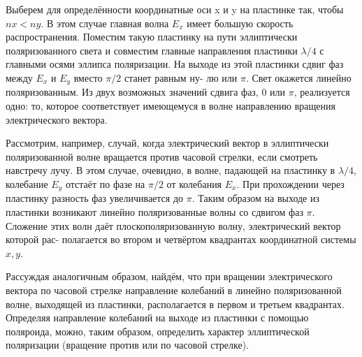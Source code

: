 \documentclass[a4paper,12pt]{article}
\begin{document}
Выберем для определённости координатные оси x и y на пластинке
так, чтобы $ nx < ny $. В этом случае главная волна $ E_x $ имеет большую
скорость распространения. Поместим такую пластинку на пути эллиптически поляризованного света и совместим главные направления пластинки $ \lambda/4 $ с главными осями эллипса поляризации. На выходе из этой
пластинки сдвиг фаз между $ E_x $ и $ E_y $ вместо $ \pi/2 $ станет равным ну-
лю или $ \pi $. Свет окажется линейно поляризованным. Из двух возможных значений сдвига фаз, 0 или $ \pi $, реализуется одно: то, которое соответствует имеющемуся в волне направлению вращения электрического вектора.

Рассмотрим, например, случай, когда электрический вектор в эллиптически поляризованной волне вращается против часовой стрелки,
если смотреть навстречу лучу. В этом случае, очевидно, в волне, падающей на пластинку в $ \lambda/4 $, колебание $ E_y $ отстаёт по фазе на $ \pi/2 $ от
колебания $ E_x $. При прохождении через пластинку разность фаз увеличивается до $ \pi $. Таким образом на выходе из пластинки возникают линейно поляризованные волны со сдвигом фаз $ \pi $. Сложение этих волн
даёт плоскополяризованную волну, электрический вектор которой рас-
полагается во втором и четвёртом квадрантах координатной системы
$ x, y $.

Рассуждая аналогичным образом, найдём, что при вращении электрического вектора по часовой стрелке направление колебаний в линейно поляризованной волне, выходящей из пластинки, располагается в первом и третьем квадрантах. Определяя направление колебаний на выходе из пластинки с помощью поляроида, можно, таким образом, определить характер эллиптической поляризации (вращение против или по часовой стрелке).
\end{document}
